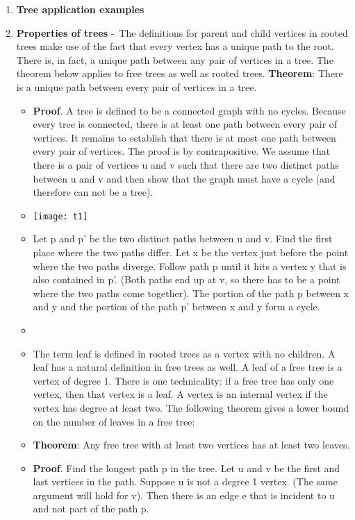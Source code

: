 \documentclass[12pt,a4paper]{article}
\begin{document}
\begin{enumerate}
\begin{itemize}
  \end{itemize} 
  \item \textbf{Tree application examples}
  \item \textbf{Properties of trees} -\ The definitions for parent and child vertices in rooted trees make use of the fact that every vertex has a unique path to the root. There is, in fact, a unique path between any pair of vertices in a tree. The theorem below applies to free trees as well as rooted trees.
  \textbf{Theorem}: There is a unique path between every pair of vertices in a tree.
  \begin{itemize}
    \item \textbf{Proof}. A tree is defined to be a connected graph with no cycles. Because every tree is connected, there is at least one path between every pair of vertices. It remains to establish that there is at most one path between every pair of vertices. The proof is by contrapositive. We assume that there is a pair of vertices u and v such that there are two distinct paths between u and v and then show that the graph must have a cycle (and therefore can not be a tree).
    \item[] \texttt{[image: t1]}
    \item Let p and p' be the two distinct paths between u and v. Find the first place where the two paths differ. Let x be the vertex just before the point where the two paths diverge. Follow path p until it hits a vertex y that is also contained in p'. (Both paths end up at v, so there has to be a point where the two paths come together). The portion of the path p between x and y and the portion of the path p' between x and y form a cycle. 
    \item[]
    \item The term leaf is defined in rooted trees as a vertex with no children. A leaf has a natural definition in free trees as well. A leaf of a free tree is a vertex of degree 1. There is one technicality: if a free tree has only one vertex, then that vertex is a leaf. A vertex is an internal vertex if the vertex has degree at least two. The following theorem gives a lower bound on the number of leaves in a free tree:
    \item[] \textbf{Theorem}: Any free tree with at least two vertices has at least two leaves.
    \item \textbf{Proof}. Find the longest path p in the tree. Let u and v be the first and last vertices in the path. Suppose u is not a degree 1 vertex. (The same argument will hold for v). Then there is an edge e that is incident to u and not part of the path p.

\end{itemize}
\end{enumerate}
\end{document}
